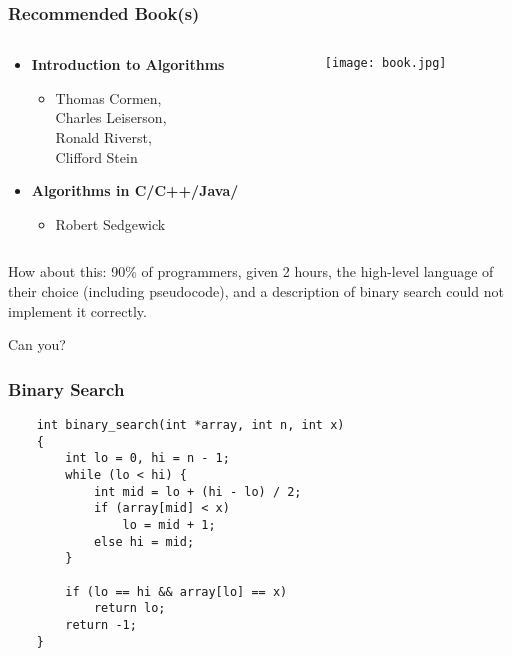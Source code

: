 \documentclass{beamer}
\begin{document}
\begin{frame}
    \frametitle{Recommended Book(s)}
    \begin{columns}[t]
        \begin{column}[T]{5cm}
            \begin{itemize}
                \item \textbf{Introduction to Algorithms}
                    \begin{itemize}
                        \item Thomas Cormen,\\ Charles Leiserson,\\ Ronald Riverst,\\ Clifford Stein
                    \end{itemize}
                \item \textbf{Algorithms in C/C++/Java/}
                    \begin{itemize}
                        \item Robert Sedgewick
                    \end{itemize}
            \end{itemize}
        \end{column}
        \begin{column}[T]{5cm}
            \texttt{[image: book.jpg]}
        \end{column}
    \end{columns}
\end{frame}


\begin{frame}
    How about this: 90\% of programmers, given 2 hours, the high-level language of their choice (including pseudocode), and a description of binary search could not implement it correctly.

    \vspace{15mm}
    \pause
    Can you?
\end{frame}

\begin{frame}[fragile]
    \frametitle{Binary Search}
    \lstset{language=C}
    \begin{lstlisting}
    int binary_search(int *array, int n, int x)
    {
        int lo = 0, hi = n - 1;
        while (lo < hi) {
            int mid = lo + (hi - lo) / 2;
            if (array[mid] < x)
                lo = mid + 1;
            else hi = mid;
        }

        if (lo == hi && array[lo] == x)
            return lo;
        return -1;
    }
    \end{lstlisting}
\end{frame}
\end{document}
